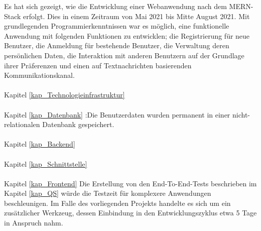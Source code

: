 Es hat sich gezeigt, wie die Entwicklung einer Webanwendung nach dem MERN-Stack erfolgt. Dies in einem Zeitraum von Mai 2021 bis Mitte August 2021. Mit grundlegenden Programmierkenntnissen war es möglich, eine funktionelle Anwendung mit folgenden Funktionen zu entwicklen; die Registrierung für neue Benutzer, die Anmeldung für bestehende Benutzer, die Verwaltung deren persönlichen Daten, die Interaktion mit anderen Benutzern auf der Grundlage ihrer Präferenzen und einen auf Textnachrichten basierenden Kommunikationskanal.
\\\\
Kapitel \ref{kap_Technologieinfrastruktur}
\\\\
Kapitel \ref{kap_Datenbank} :Die Benutzerdaten wurden permanent in einer nicht-relationalen Datenbank gespeichert.
\\\\
Kapitel \ref{kap_Backend} 
\\\\
Kapitel \ref{kap_Schnittstelle}\\\\
Kapitel \ref{kap_Frontend}
Die Erstellung von den End-To-End-Tests beschrieben im Kapitel \ref{kap_QS} würde die Testzeit für komplexere Anwendungen beschleunigen. Im Falle des vorliegenden Projekts handelte es sich um ein zusätzlicher Werkzeug, dessen Einbindung in den Entwicklungszyklus etwa 5 Tage in Anspruch nahm.
